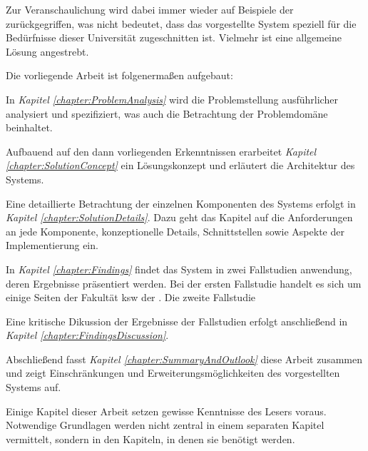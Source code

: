         Zur Veranschaulichung wird dabei immer wieder auf Beispiele der \fernUni
        zurückgegriffen, was nicht bedeutet, dass das vorgestellte System
        speziell für die Bedürfnisse dieser Universität zugeschnitten ist.
        Vielmehr ist eine allgemeine Lösung angestrebt.

        Die vorliegende Arbeit ist folgenermaßen aufgebaut:

        In \textit{Kapitel \ref{chapter:ProblemAnalysis}} wird die Problemstellung ausführlicher
        analysiert und spezifiziert, was auch die Betrachtung der Problemdomäne beinhaltet.

        Aufbauend auf den dann vorliegenden Erkenntnissen erarbeitet
        \textit{Kapitel \ref{chapter:SolutionConcept}}
        ein Lösungskonzept und erläutert die Architektur des Systems.

        Eine detaillierte Betrachtung der einzelnen Komponenten des Systems
        erfolgt in \textit{Kapitel \ref{chapter:SolutionDetails}}.
        Dazu geht das Kapitel auf die Anforderungen an jede Komponente,
        konzeptionelle Details, Schnittstellen sowie Aspekte der Implementierung ein.
        
        In \textit{Kapitel \ref{chapter:Findings}} findet das System in zwei Fallstudien
        anwendung, deren Ergebnisse präsentiert werden.
        Bei der ersten Fallstudie handelt es sich um einige Seiten der Fakultät \gls{ksw}
        der \fernUni.
        Die zweite Fallstudie %

        Eine kritische Dikussion der Ergebnisse der Fallstudien erfolgt anschließend in
        \textit{Kapitel \ref{chapter:FindingsDiscussion}}.

        Abschließend fasst \textit{Kapitel \ref{chapter:SummaryAndOutlook}}
        diese Arbeit zusammen und zeigt Einschränkungen und Erweiterungsmöglichkeiten
        des vorgestellten Systems auf.

        Einige Kapitel dieser Arbeit setzen gewisse Kenntnisse des Lesers voraus.
        Notwendige Grundlagen werden nicht zentral in einem separaten Kapitel vermittelt,
        sondern in den Kapiteln, in denen sie benötigt werden.